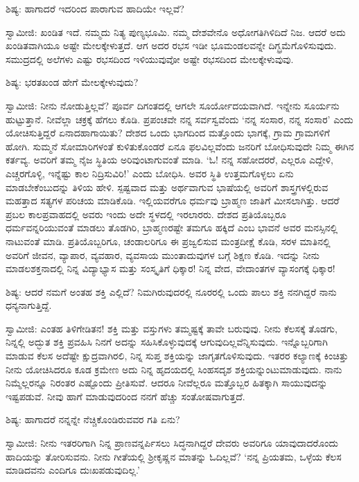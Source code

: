 ಶಿಷ್ಯ: ಹಾಗಾದರೆ ಇದರಿಂದ ಪಾರಾಗುವ ಹಾದಿಯೇ ಇಲ್ಲವೆ?

ಸ್ವಾಮೀಜಿ: ಖಂಡಿತ ಇದೆ. ನಮ್ಮದು ನಿತ್ಯ ಪುಣ್ಯಭೂಮಿ. ನಮ್ಮ ದೇಶವೇನೊ ಅಧೋಗತಿಗಿಳಿದಿದೆ ನಿಜ. ಆದರೆ ಅದು ಖಂಡಿತವಾಗಿಯೂ ಅಷ್ಟೇ ಮೇಲಕ್ಕೇಳುತ್ತದೆ. ಆಗ ಅದರ ರಭಸ ಇಡೀ ಭೂಮಂಡಲವನ್ನೇ ದಿಗ್ಭ್ರಮೆಗೊಳಿಸುವುದು. ಸಮುದ್ರದಲ್ಲಿ ಅಲೆಗಳು ಎಷ್ಟು ರಭಸದಿಂದ ಇಳಿಯುವುವೋ ಅಷ್ಟೇ ರಭಸದಿಂದ ಮೇಲಕ್ಕೇಳುವುವು.

ಶಿಷ್ಯ: ಭರತಖಂಡ ಹೇಗೆ ಮೇಲಕ್ಕೇಳುವುದು?

ಸ್ವಾಮೀಜಿ: ನೀನು ನೋಡುತ್ತಿಲ್ಲವೆ? ಪೂರ್ವ ದಿಗಂತದಲ್ಲಿ ಆಗಲೇ ಸೂರ್ಯೋದಯವಾಗಿದೆ. ಇನ್ನೇನು ಸೂರ್ಯನು ಹುಟ್ಟುತ್ತಾನೆ. ನೀವೆಲ್ಲಾ ಚಕ್ರಕ್ಕೆ ಹೆಗಲು ಕೊಡಿ. ಪ್ರಪಂಚವೇ ನನ್ನ ಸರ್ವಸ್ವವೆಂದು ‘ನನ್ನ ಸಂಸಾರ, ನನ್ನ ಸಂಸಾರ’ ಎಂದು ಯೋಚಿಸುತ್ತಿದ್ದರೆ ಏನಾದಹಾಗಾಯಿತು? ದೇಶದ ಒಂದು ಭಾಗದಿಂದ ಮತ್ತೊಂದು ಭಾಗಕ್ಕೆ, ಗ್ರಾಮ ಗ್ರಾಮಗಳಿಗೆ ಹೋಗಿ. ಸುಮ್ಮನೆ ಸೋಮಾರಿಗಳಂತೆ ಕುಳಿತುಕೊಂಡರೆ ಏನೂ ಫಲವಿಲ್ಲವೆಂದು ಜನರಿಗೆ ಬೋಧಿಸುವುದೇ ನಿಮ್ಮ ಈಗಿನ ಕರ್ತವ್ಯ. ಅವರಿಗೆ ತಮ್ಮ ನೈಜ ಸ್ಥಿತಿಯ ಅರಿವುಂಟಾಗುವಂತೆ ಮಾಡಿ. ‘ಓ! ನನ್ನ ಸಹೋದರರೆ, ಎಲ್ಲರೂ ಎದ್ದೇಳಿ, ಎಚ್ಚರಗೊಳ್ಳಿ, ಇನ್ನೆಷ್ಟು ಕಾಲ ನಿದ್ರಿಸುವಿರಿ!’ ಎಂದು ಬೋಧಿಸಿ. ಅವರ ಸ್ಥಿತಿ ಉತ್ತಮಗೊಳ್ಳಲು ಏನು ಮಾಡಬೇಕೆಂಬುದನ್ನು ತಿಳಿಯ ಹೇಳಿ. ಸ್ಪಷ್ಟವಾದ ಮತ್ತು ಅರ್ಥವಾಗುವ ಭಾಷೆಯಲ್ಲಿ ಅವರಿಗೆ ಶಾಸ್ತ್ರಗಳಲ್ಲಿರುವ ಮಹತ್ತಾದ ಸತ್ಯಗಳ ಪರಿಚಯ ಮಾಡಿಕೊಡಿ. ಇಲ್ಲಿಯವರೆಗೂ ಧರ್ಮವು ಬ್ರಾಹ್ಮಣ ಜಾತಿಗೆ ಮೀಸಲಾಗಿತ್ತು. ಆದರೆ ಪ್ರಬಲ ಕಾಲಪ್ರವಾಹದಲ್ಲಿ ಅವರು ಇಂದು ಅದೇ ಸ್ಥಳದಲ್ಲಿ ಇರಲಾರರು. ದೇಶದ ಪ್ರತಿಯೊಬ್ಬರೂ ಧರ್ಮವನ್ನರಿಯುವಂತೆ ಮಾಡಲು ತೊಡಗಿರಿ, ಬ್ರಾಹ್ಮಣರಷ್ಟೇ ತಮಗೂ ಹಕ್ಕಿದೆ ಎಂಬ ಭಾವನೆ ಅವರ ಮನಸ್ಸಿನಲ್ಲಿ ನಾಟುವಂತೆ ಮಾಡಿ. ಪ್ರತಿಯೊಬ್ಬರಿಗೂ, ಚಂಡಾಲರಿಗೂ ಈ ಪ್ರಜ್ವಲಿಸುವ ಮಂತ್ರದೀಕ್ಷೆ ಕೊಡಿ, ಸರಳ ಮಾತಿನಲ್ಲಿ ಅವರಿಗೆ ಜೀವನ, ವ್ಯಾಪಾರ, ವ್ಯವಹಾರ, ವ್ಯವಸಾಯ ಮುಂತಾದುವುಗಳ ಬಗ್ಗೆ ಶಿಕ್ಷಣ ಕೊಡಿ. ಇದನ್ನು ನೀನು ಮಾಡಲಶಕ್ತನಾದಲ್ಲಿ ನಿನ್ನ ವಿದ್ಯಾಭ್ಯಾಸ ಮತ್ತು ಸಂಸ್ಕೃತಿಗೆ ಧಿಕ್ಕಾರ! ನಿನ್ನ ವೇದ, ವೇದಾಂತಗಳ ವ್ಯಾಸಂಗಕ್ಕೆ ಧಿಕ್ಕಾರ!

ಶಿಷ್ಯ: ಆದರೆ ನಮಗೆ ಅಂತಹ ಶಕ್ತಿ ಎಲ್ಲಿದೆ? ನಿಮಗಿರುವುದರಲ್ಲಿ ನೂರರಲ್ಲಿ ಒಂದು ಪಾಲು ಶಕ್ತಿ ನನಗಿದ್ದರೆ ನಾನು ಧನ್ಯನಾಗುತ್ತಿದ್ದೆ.

ಸ್ವಾಮೀಜಿ: ಎಂತಹ ತಿಳಿಗೇಡಿತನ! ಶಕ್ತಿ ಮತ್ತು ವಸ್ತುಗಳು ತಮ್ಮಷ್ಟಕ್ಕೆ ತಾವೇ ಬರುವುವು. ನೀನು ಕೆಲಸಕ್ಕೆ ತೊಡಗು, ನಿನ್ನಲ್ಲಿ ಅದ್ಭುತ ಶಕ್ತಿ ಪ್ರವಹಿಸಿ ನಿನಗೆ ಅದನ್ನು ಸಹಿಸಿಕೊಳ್ಳುವುದಕ್ಕೆ ಆಗುವುದಿಲ್ಲವೆನ್ನಿಸುವುದು. ಇನ್ನೊಬ್ಬರಿಗಾಗಿ ಮಾಡುವ ಕೆಲಸ ಅದೆಷ್ಟೇ ಕ್ಷುದ್ರವಾಗಿರಲಿ, ನಿನ್ನ ಸುಪ್ತ ಶಕ್ತಿಯನ್ನು ಜಾಗೃತಗೊಳಿಸುವುದು. ಇತರರ ಕಲ್ಯಾಣಕ್ಕೆ ಕಿಂಚಿತ್ತು ನೀನು ಯೋಚಿಸಿದರೂ ಕೂಡ ಕ್ರಮೇಣ ಅದು ನಿನ್ನ ಹೃದಯದಲ್ಲಿ ಸಿಂಹಸದೃಶ ಶಕ್ತಿಯನ್ನುಂಟುಮಾಡುವುದು. ನಾನು ನಿಮ್ಮೆಲ್ಲರನ್ನೂ ನಿರಂತರ ಎಷ್ಟೊಂದು ಪ್ರೀತಿಸುವೆ. ಆದರೂ ನೀವೆಲ್ಲರೂ ಮತ್ತೊಬ್ಬರ ಹಿತಕ್ಕಾಗಿ ಸಾಯುವುದನ್ನು ಇಷ್ಟಪಡುವೆ. ನೀವು ಹಾಗೆ ಮಾಡುವುದರಿಂದ ನನಗೆ ಹೆಚ್ಚು ಸಂತೋಷವಾಗುತ್ತದೆ.

ಶಿಷ್ಯ: ಹಾಗಾದರೆ ನನ್ನನ್ನೇ ನೆಚ್ಚಿಕೊಂಡಿರುವವರ ಗತಿ ಏನು?

ಸ್ವಾಮೀಜಿ: ನೀನು ಇತರರಿಗಾಗಿ ನಿನ್ನ ಪ್ರಾಣವನ್ನರ್ಪಿಸಲು ಸಿದ್ಧನಾಗಿದ್ದರೆ ದೇವರು ಅವರಿಗೂ ಯಾವುದಾದರೊಂದು ಹಾದಿಯನ್ನು ತೋರಿಸುವನು. ನೀನು ಗೀತೆಯಲ್ಲಿ ಶ‍್ರೀಕೃಷ್ಣನ ಮಾತನ್ನು ಓದಿಲ್ಲವೆ? ‘ನನ್ನ ಪ್ರಿಯತಮ, ಒಳ್ಳೆಯ ಕೆಲಸ ಮಾಡಿದವನು ಎಂದಿಗೂ ದುಃಖಪಡುವುದಿಲ್ಲ.’

